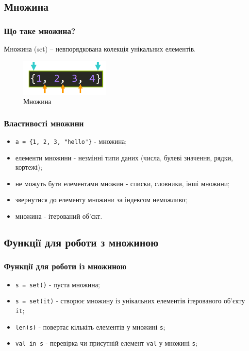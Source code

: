  \subsection{Множина} 
\begin{frame}
\frametitle{Що таке множина?}
Множина (set) – невпорядкована колекція унікальних елементів.

\begin{figure}
\begin{center}
 \includegraphics[width=0.4\textwidth]{pictures/set.png}
\caption{Множина}
\label{set} 
\end{center}
\end{figure}

\end{frame}

\begin{frame}
\frametitle{Властивості множини}
\begin{itemize}
  \item \texttt{a = \{1, 2, 3, "hello"\}} - множина;
  \item елементи множини - незмінні типи даних (числа, булеві значення, рядки, кортежі);
  \item не можуть бути елементами множин - списки, словники, інші множини;
  \item звернутися до елементу множини за індексом неможливо;
  \item множина - ітерований об'єкт.
\end{itemize}

\end{frame}

 \subsection{Функції для роботи з множиною} 
\begin{frame}
\frametitle{Функції для роботи із множиною}
\begin{itemize}
  \item \texttt{s = set()} - пуста множина;
  \item \texttt{s = set(it)} - створює множину із унікальних елементів ітерованого об'єкту \texttt{it};
  \item \texttt{len(s)} - повертає кількіть елементів у множині \texttt{s};
  \item \texttt{val in s} - перевірка чи присутній елемент \texttt{val} у множині \texttt{s};
  
\end{itemize}
\end{frame}

